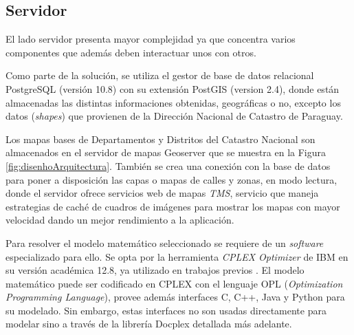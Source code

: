 \subsection{Servidor}

El lado servidor presenta mayor complejidad ya que concentra varios componentes que además deben interactuar unos con otros.

Como parte de la solución, se utiliza el gestor de base de datos relacional PostgreSQL (versión 10.8) con su extensión PostGIS (version 2.4), donde están almacenadas las distintas informaciones obtenidas, geográficas o no, excepto los datos (\textit{shapes}) que provienen de la Dirección Nacional de Catastro de Paraguay.

Los mapas bases de Departamentos y Distritos del Catastro Nacional son almacenados en el servidor de mapas Geoserver que se muestra en la Figura \ref{fig:disenhoArquitectura}. También se crea una conexión con la base de datos para poner a disposición las capas o mapas de calles y zonas, en modo lectura, donde el servidor ofrece servicios web de mapas \textit{TMS}, servicio que maneja estrategias de caché de cuadros de imágenes para mostrar los mapas con mayor velocidad dando un mejor rendimiento a la aplicación.


Para resolver el modelo matemático seleccionado se requiere de un \textit{software} especializado para ello. Se opta por la herramienta \textit{CPLEX Optimizer} de IBM \citep{CPLEXOptimizer} en su versión académica 12.8, ya utilizado en trabajos previos \citep{Vecchi2016ACollection,Ramos2018TheApproaches,BabaeeTirkolaee2019DevelopingStudy}. El modelo matemático puede ser codificado en CPLEX con el lenguaje OPL ({\textit{Optimization Programming Language}}), provee además interfaces C, C++, Java y Python para su modelado. Sin embargo, estas interfaces no son usadas directamente para modelar sino a través de la librería Docplex \citep{Docplex} detallada más adelante.

